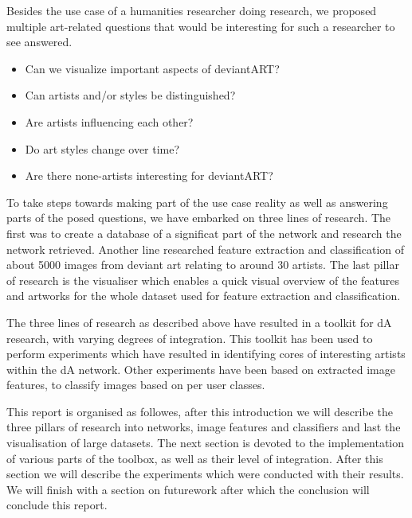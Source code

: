 Besides the use case of a humanities researcher doing research, we proposed multiple art-related questions that would be interesting for such a researcher to see answered.
\begin{itemize}
\item Can we visualize important aspects of deviantART?
\item Can artists and/or styles be distinguished?
\item Are artists influencing each other?
\item Do art styles change over time?
\item Are there none-artists interesting for deviantART?
\end{itemize}

To take steps towards making part of the use case reality as well as answering parts of the posed questions, we have embarked on three lines of research. The first was to create a database of a significat part of the network and research the network retrieved. Another line researched feature extraction and classification of about 5000 images from deviant art relating to around 30 artists. The last pillar of research is the visualiser which enables a quick visual overview of the features and artworks for the whole dataset used for feature extraction and classification.

The three lines of research as described above have resulted in a toolkit for dA research, with varying degrees of integration. This toolkit has been used to perform experiments which have resulted in identifying cores of interesting artists within the dA network. Other experiments have been based on extracted image features, to classify images based on per user classes.

This report is organised as followes, after this introduction we will describe the three pillars of research into networks, image features and classifiers and last the visualisation of large datasets. The next section is devoted to the implementation of various parts of the toolbox, as well as their level of integration. After this section we will describe the experiments which were conducted with their results. We will finish with a section on futurework after which the conclusion will conclude this report. 


